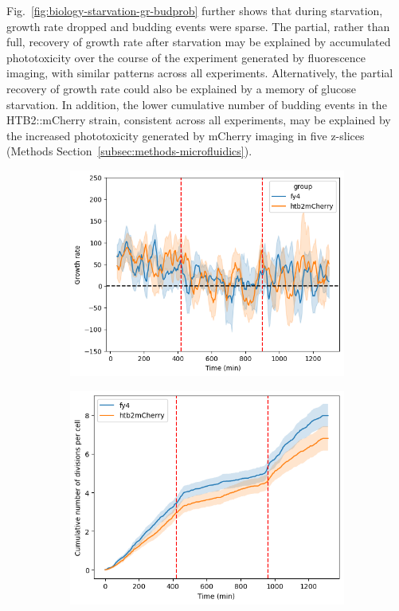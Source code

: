 Fig.\ \ref{fig:biology-starvation-gr-budprob} further shows that during starvation, growth rate dropped and budding events were sparse.
The partial, rather than full, recovery of growth rate after starvation may be explained by accumulated phototoxicity over the course of the experiment generated by fluorescence imaging, with similar patterns across all experiments.
Alternatively, the partial recovery of growth rate could also be explained by a memory of glucose starvation.
In addition, the lower cumulative number of budding events in the HTB2::mCherry strain, consistent across all experiments, may be explained by the increased phototoxicity generated by mCherry imaging in five z-slices (Methods Section~\ref{subsec:methods-microfluidics}).

\begin{figure}
  \centering
  \begin{subfigure}[htpb]{0.45\textwidth}
   \centering
   \includegraphics[width=\textwidth]{allstrains_19972_gr}
   \caption{
   }
   \label{fig:biology-starvation-gr}
  \end{subfigure}%
  \begin{subfigure}[htpb]{0.45\textwidth}
   \centering
   \includegraphics[width=\textwidth]{allstrains_19972_cumul}
   \caption{
   }
   \label{fig:biology-starvation-cumul}
  \end{subfigure}


\end{figure}
